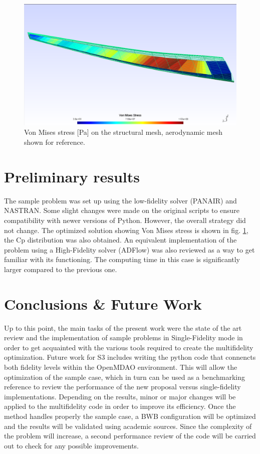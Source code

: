 \begin{figure}[H]
    \centering
    \includegraphics[width=\linewidth]{images/structure_aeromesh.PNG}
    \caption{Von Mises stress [Pa] on the structural mesh, aerodynamic mesh shown for reference.}
    \label{fig:structure_aeromesh}
\end{figure}

\section{Preliminary results}
\label{sec:results}

The sample problem was set up using the low-fidelity solver (PANAIR) and NASTRAN. Some slight changes were made on the original scripts to ensure compatibility with newer versions of Python. However, the overall strategy did not change. The optimized solution showing Von Mises stress is shown in fig. \ref{fig:structure_aeromesh}, the Cp distribution was also obtained. An equivalent implementation of the problem using a High-Fidelity solver (ADFlow) was also reviewed as a way to get familiar with its functioning. The computing time in this case is significantly larger compared to the previous one. 


\section{Conclusions \& Future Work}
\label{sec:conclusions}
Up to this point, the main tasks of the present work were the state of the art review and the implementation of sample problems in Single-Fidelity mode in order to get acquainted with the various tools required to create the multifidelity optimization. 
Future work for S3 includes writing the python code that connencts both fidelity levels within the OpenMDAO environment. This will allow the optimization of the sample case, which in turn can be used as a benchmarking reference to review the performance of the new proposal versus single-fidelity implementations. Depending on the results, minor or major changes will be applied to the multifidelity code in order to improve its efficiency. Once the method handles properly the sample case, a BWB configuration will be optimized and the results will be validated using academic sources. Since the complexity of the problem will increase, a second performance review of the code will be carried out to check for any possible improvements.   